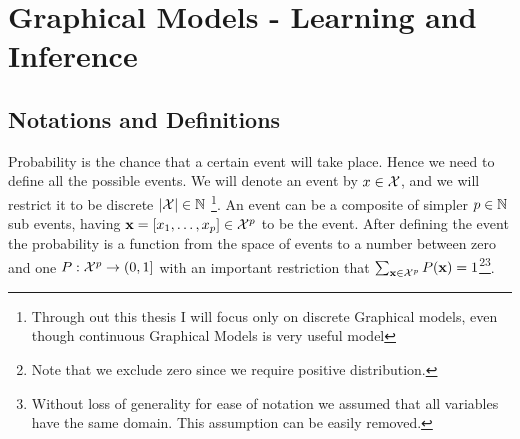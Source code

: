 \section{Graphical Models - Learning and Inference}
\subsection{Notations and Definitions}
\label{sec:def}
Probability is the chance that a certain event will take place.
Hence we need to define all the possible events.
We will denote an event by $x \in {\cal X}$, and we will restrict it to be discrete $ |{\cal X}| \in \mathbb{N}$
\footnote{Through out this thesis I will focus only on discrete Graphical models, even though continuous Graphical Models is very useful model}.
An event can be a composite of simpler $p \in \mathbb{N}$ sub events, having ${\bf x} = [x_1, \ldots, x_{p}] \in {\cal X}^p$ to be the event.
After defining the event the probability is  a function from the space of events to a number between zero and one $P:{\cal X}^{p} \to (0,1]$ with an important restriction that $\sum_{{\bf x} \in {\cal X}^{p}} P({\bf x}) = 1$\footnote{Note that we exclude zero since we require positive distribution.}\footnote{Without loss of generality for ease of notation we assumed that all variables have the same domain. This assumption can be easily removed.}.

